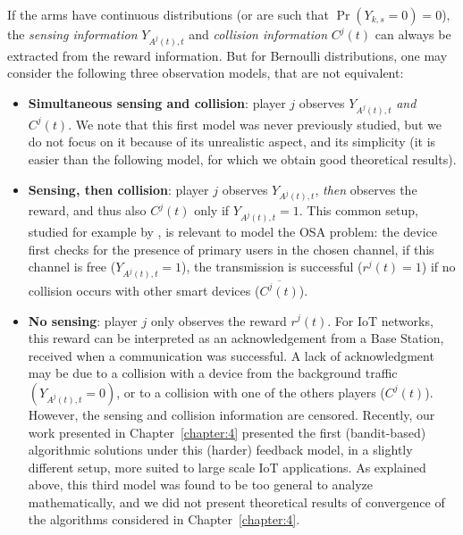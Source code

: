 If the arms have continuous distributions (or are such that  $\Pr(Y_{k,s}=0)=0$), the \emph{sensing information} $Y_{A^j(t),t}$ and \emph{collision information} $C^j(t)$ can always be extracted from the reward information.
But for Bernoulli distributions, one may consider the following three observation models, that are not equivalent:

\begin{itemize}
  \item[\modelun]
    \textbf{Simultaneous sensing and collision}: player $j$ observes  $Y_{A^j(t),t}$ \emph{and} $C^j(t)$.
    We note that this first model was never previously studied, but we do not focus on it because of its unrealistic aspect, and its simplicity (it is easier than the following model, for which we obtain good theoretical results).
  \item[\modeldeux]
    \textbf{Sensing, then collision}: player $j$ observes $Y_{A^j(t),t}$, \emph{then} observes the reward, and thus also $C^j(t)$ only if $Y_{A^j(t),t} = 1$.
    This common setup, studied for example by \cite{Anandkumar11,Rosenski16}, is relevant to model the OSA problem: the device first checks for the presence of primary users in the chosen channel,
    if this channel is free ($Y_{A^j(t),t}=1$), the transmission is successful ($r^j(t)=1$) if no collision occurs with other smart devices ($\overline{C^j(t)}$).
  \item[\modeltrois]
    \textbf{No sensing}: player $j$ only observes the reward $r^j(t)$.
    For IoT networks, this reward can be interpreted as an acknowledgement from a Base Station,
    received when a communication was successful.
    A lack of acknowledgment may be due to a collision
    with a device from the background traffic $(Y_{A^j(t),t}=0)$,
    or to a collision with one of the others players ($C^j(t)$).
    However, the sensing and collision information are censored.
    Recently, our work presented in Chapter~\ref{chapter:4} \cite{Bonnefoi17} presented the first (bandit-based) algorithmic solutions under this (harder) feedback model, in a slightly different setup, more suited to large scale IoT applications. As explained above, this third model was found to be too general to analyze mathematically, and we did not present theoretical results of convergence of the algorithms considered in Chapter~\ref{chapter:4}.
\end{itemize}

